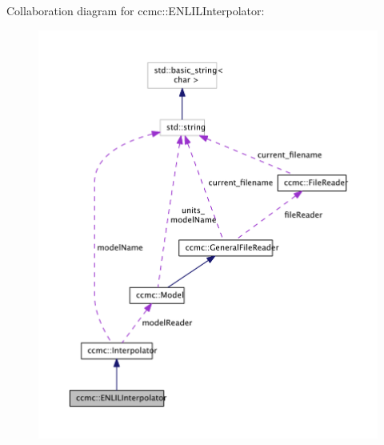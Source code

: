 Collaboration diagram for ccmc\-:\-:E\-N\-L\-I\-L\-Interpolator\-:\nopagebreak
\begin{figure}[H]
\begin{center}
\leavevmode
\includegraphics[width=350pt]{classccmc_1_1_e_n_l_i_l_interpolator__coll__graph}
\end{center}
\end{figure}
